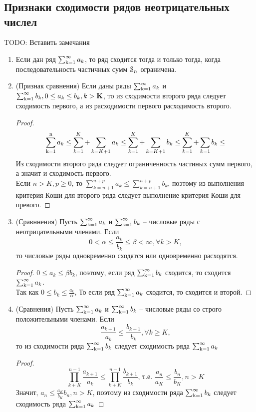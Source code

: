 \chapter{}
\section*{Признаки сходимости рядов неотрицательных числел}
TODO: Вставить замечания
\begin{enumerate}
\item
Если дан ряд $\operatorname{\sum_{k=1}^{\infty}} a_k$, то ряд сходится тогда и только тогда, когда последовательность частичных сумм $\operatorname{\EuScript{S}}_n$ ограничена.
\item
(Признак сравнения) Если даны  ряды $\operatorname{\sum_{k=1}^{\infty}} a_k $ и $\operatorname{\sum_{k=1}^{\infty}} b_k , 0 \le a_k \le b_k, k>\mathbf K$, то из сходимости второго ряда следует сходимость первого, а из расходимости первого расходимость второго.
\begin{proof}
$$ \operatorname{\sum_{k=1}^{n}} a_k \le \sum_{k=1}^{K} + \sum_{k=K+1} a_k \le \sum_{k=1}^{K} + \sum_{k=K+1} b_k \le  \sum_{k=1}^{K} + \sum_{k=1} b_k \le$$
Из сходимости второго ряда следует ограниченность частиных сумм первого, а значит и сходимость первого.\\
Если $n>K, p \ge 0$, то $\sum_{k=n+1}^{n+p}a_k \le \sum_{k=n+1}^{n+p} b_k$, поэтому из выполнения критерия Коши для второго ряда следует выполнение критерия Коши для превого. 
\end{proof}
\item
(Сравннения) Пусть $\operatorname{\sum_{k=1}^{\infty}} a_k $ и $\operatorname{\sum_{k=1}^{\infty}} b_k$ -- числовые ряды с неотрицательными членами. Если $$0 < \alpha \le \frac{a_k}{b_k} \le \beta < \infty, \forall k>K,$$
то числовые ряды одновременно сходятся или одновременно расходятся.
\begin{proof}
$0 \le a_k \le \beta b_k$, поэтому, если ряд $\operatorname{\sum_{k=1}^{\infty}} b_k$ сходится, то сходится $\operatorname{\sum_{k=1}^{\infty}} a_k$.\\
Так как $0 \le b_k \le \frac{a_k}{\alpha}$,
То если ряд $\operatorname{\sum_{k=1}^{\infty}} a_k$ сходится, то сходится и второй.
\end{proof}
\item
(Сравнения) Пусть $\operatorname{\sum_{k=1}^{\infty}} a_k $ и $\operatorname{\sum_{k=1}^{\infty}} b_k$ -- числовые ряды со строго положительными членами. Если
$$ \frac{a_{k+1}}{a_k}\le \frac{b_{k+1}}{b_k}, \forall k \ge K,$$
то из сходимости ряда $\operatorname{\sum_{k=1}^{\infty}} b_k$ следует сходимость ряда $\operatorname{\sum_{k=1}^{\infty}} a_k$
\begin{proof}
$$ \prod_{k+K}^{n-1}\frac{a_{k+1}}{a_k} \le \prod_{k+K}^{n-1}\frac{b_{k+1}}{b_k}\text{, т.е. } \frac{a_{n}}{a_K} \le \frac{b_{n}}{b_K}, n>K$$
Значит, $a_n \le \frac{a_K}{b_K}b_n, n>K$, поэтому из сходимости ряда $\operatorname{\sum_{k=1}^{\infty}} b_k$ следует сходимость ряда $\operatorname{\sum_{k=1}^{\infty}} a_k$

\end{proof}
\end{enumerate}
